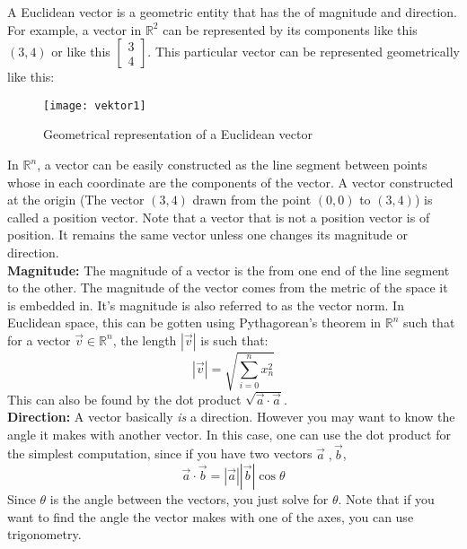 \documentclass[12pt]{article}
\begin{document}

A Euclidean vector is a geometric entity that has the  of magnitude and direction. For example, a vector in $\mathbb{R}^2$ can be represented by its components like this $(3,4)$ or like this $\left[\begin{array}{c}3\\4\end{array}\right]$. This particular vector can be represented geometrically like this:
\begin{figure}[htbp]
\begin{centering}
\texttt{[image: vektor1]}
\caption{Geometrical representation of a Euclidean vector}
\end{centering}
\end{figure}
In $\mathbb{R}^n$, a vector can be easily constructed as the line segment between points whose  in each coordinate are the components of the vector. A vector constructed at the origin (The vector $(3,4)$ drawn from the point $(0,0)$ to $(3,4)$) is called a position vector. Note that a vector that is not a position vector is  of position. It remains the same vector unless one changes its magnitude or direction.\\
\textbf{Magnitude:} The magnitude of a vector is the  from one end of the line segment to the other. The magnitude of the vector comes from the metric of the space it is embedded in. It's magnitude is also referred to as the vector norm. In Euclidean space, this can be gotten using Pythagorean's theorem in $\mathbb{R}^n$ such that for a vector $\vec{v}\in\mathbb{R}^n$, the length $|\vec{v}|$ is such that:
$$|\vec{v}|=\sqrt{\sum_{i=0}^n x_n^2}$$
This can also be found by the dot product $\sqrt{\vec{a}\cdot\vec{a}}$.\\
\textbf{Direction:} A vector basically \emph{is} a direction. However you may want to know the angle it makes with another vector. In this case, one can use the dot product for the simplest computation, since if you have two vectors $\vec{a}\; ,\vec{b}$, $$\vec{a}\cdot\vec{b} = |\vec{a}||\vec{b}|\cos\theta$$
Since $\theta$ is the angle between the vectors, you just solve for $\theta$. Note that if you want to find the angle the vector makes with one of the axes, you can use trigonometry.
\end{document}
